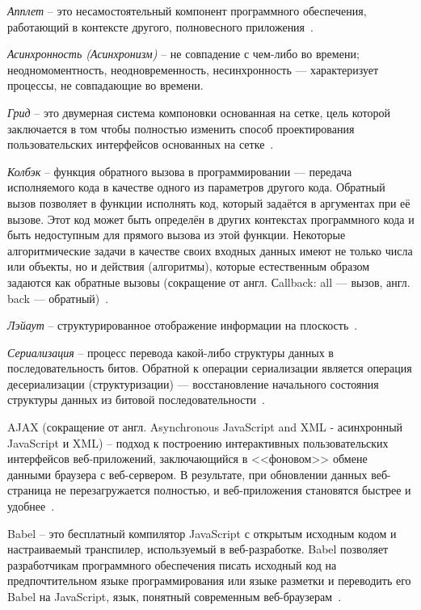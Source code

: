 \label{sec:definitions}

\emph{Апплет} -- это несамостоятельный компонент программного обеспечения, работающий в контексте другого, полновесного приложения~\cite{wiki_applet}.

\emph{Асинхронность (Асинхронизм)} -- не совпадение с чем-либо во времени; неодномоментность, неодновременность, несинхронность — характеризует процессы, не совпадающие во времени.

\emph{Грид} -- это двумерная система компоновки основанная на сетке, цель которой заключается в том чтобы полностью изменить способ проектирования пользовательских интерфейсов основанных на сетке~\cite{grid}.

\emph{Колбэк} -- функция обратного вызова в программировании — передача исполняемого кода в качестве одного из параметров другого кода. Обратный вызов позволяет в функции исполнять код, который задаётся в аргументах при её вызове. Этот код может быть определён в других контекстах программного кода и быть недоступным для прямого вызова из этой функции. Некоторые алгоритмические задачи в качестве своих входных данных имеют не только числа или объекты, но и действия (алгоритмы), которые естественным образом задаются как обратные вызовы (сокращение от англ. Сallback: all — вызов, англ. back — обратный)~\cite{wiki_callback}.

\emph{Лэйаут} -- структурированное отображение информации на плоскость~\cite{wiki_layout}.

\emph{Сериализация} -- процесс перевода какой-либо структуры данных в последовательность битов. Обратной к операции сериализации является операция десериализации (структуризации) — восстановление начального состояния структуры данных из битовой последовательности~\cite{wiki_serialization}.

AJAX (сокращение от англ. Asynchronous JavaScript and XML - асинхронный JavaScript и XML) -- подход к построению интерактивных пользовательских интерфейсов веб-приложений, заключающийся в <<фоновом>> обмене данными браузера с веб-сервером. В результате, при обновлении данных веб-страница не перезагружается полностью, и веб-приложения становятся быстрее и удобнее~\cite{wiki_ajax}.

Babel -- это бесплатный компилятор JavaScript с открытым исходным кодом и настраиваемый транспилер, используемый в веб-разработке. Babel позволяет разработчикам программного обеспечения писать исходный код на предпочтительном языке программирования или языке разметки и переводить его Babel на JavaScript, язык, понятный современным веб-браузерам~\cite{babel}.

